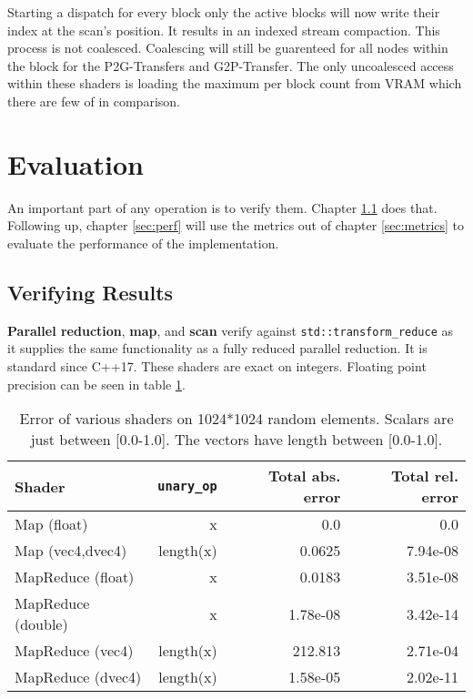 \documentclass[m,times]{cgMA}
\begin{document}
Starting a dispatch for every block only the active blocks will now write their index at the scan's position. It results in an indexed stream compaction. This process is not coalesced. Coalescing will still be guarenteed for all nodes within the block for the P2G-Transfers and G2P-Transfer. The only uncoalesced access within these shaders is loading the maximum per block count from VRAM which there are few of in comparison.

\clearpage
\section{Evaluation}\label{sec:eval}
An important part of any operation is to verify them. Chapter \ref{sec:verify} does that. Following up, chapter \ref{sec:perf} will use the metrics out of chapter \ref{sec:metrics} to evaluate the performance of the implementation.
\subsection{Verifying Results}\label{sec:verify}
\textbf{Parallel reduction}, \textbf{map}, and \textbf{scan} verify against \texttt{std::transform\_reduce} as it supplies the same functionality as a fully reduced parallel reduction. It is standard since C++17. These shaders are exact on integers. Floating point precision can be seen in table \ref{tab:parallel_red}.
\begin{table}[!b]
  \begin{tabular}{|l|r|r|r|}\hline
    Shader       & \texttt{unary\_op} & Total abs. error & Total rel. error \\\hline
    Map (float)   & x          & 0.0    & 0.0      \\\hline
    Map (vec4,dvec4)   & length(x)  &0.0625 & 7.94e-08 \\\hline\hline
    MapReduce (float)& x  &0.0183 & 3.51e-08 \\\hline
    MapReduce (double)& x  &1.78e-08 & 3.42e-14 \\\hline
    MapReduce (vec4)& length(x)  &212.813 & 2.71e-04 \\\hline
    MapReduce (dvec4)& length(x)  &1.58e-05 & 2.02e-11 \\\hline
  \end{tabular}
  \caption{Error of various shaders on 1024*1024 random elements. Scalars are just between [0.0-1.0]. The vectors have length between [0.0-1.0].}
  \label{tab:parallel_red}
\end{table}
\end{document}
